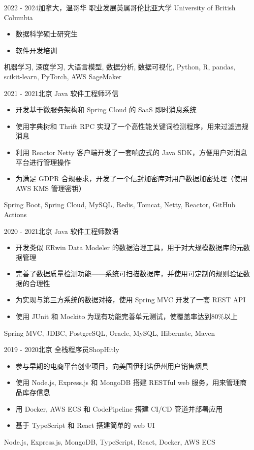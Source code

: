 \begin{experiences}

\experience
{2022 - 2024}{加拿大，温哥华}
{职业发展}{英属哥伦比亚大学 University of British Columbia}
{
    \begin{itemize}
    \item 数据科学硕士研究生
    \item 软件开发培训
    \end{itemize}
}
{机器学习, 深度学习, 大语言模型, 数据分析, 数据可视化, Python, R, pandas, scikit-learn, PyTorch, AWS SageMaker}

\experience
{2021 - 2021}{北京}
{Java 软件工程师}{环信}
{
    \begin{itemize}
    \item 开发基于微服务架构和 Spring Cloud 的 SaaS 即时消息系统
    \item 使用字典树和 Thrift RPC 实现了一个高性能关键词检测程序，用来过滤违规消息
    \item 利用 Reactor Netty 客户端开发了一套响应式的 Java SDK，方便用户对消息平台进行管理操作
    \item 为满足 GDPR 合规要求，开发了一个信封加密库对用户数据加密处理（使用 AWS KMS 管理密钥）
    \end{itemize}
}
{Spring Boot, Spring Cloud, MySQL, Redis, Tomcat, Netty, Reactor, GitHub Actions}

\experience
{2020 - 2021}{北京}
{Java 软件工程师}{数语}
{
    \begin{itemize}
    \item 开发类似 ERwin Data Modeler 的数据治理工具，用于对大规模数据库的元数据管理
    \item 完善了数据质量检测功能——系统可扫描数据库，并使用可定制的规则验证数据的合理性
    \item 为实现与第三方系统的数据对接，使用 Spring MVC 开发了一套 REST API
    \item 使用 JUnit 和 Mockito 为现有功能完善单元测试，使覆盖率达到80\%以上
    \end{itemize}
}
{Spring MVC, JDBC, PostgreSQL, Oracle, MySQL, Hibernate, Maven}

\experience
{2019 - 2020}{北京}
{全栈程序员}{ShopHitly}
{
    \begin{itemize}
    \item 参与早期的电商平台创业项目，向美国伊利诺伊州用户销售烟具
    \item 使用 Node.js, Express.js 和 MongoDB 搭建 RESTful web 服务，用来管理商品库存信息
    \item 用 Docker, AWS ECS 和 CodePipeline 搭建 CI/CD 管道并部署应用
    \item 基于 TypeScript 和 React 搭建简单的 web UI
    \end{itemize}
}
{Node.js, Express.js, MongoDB, TypeScript, React, Docker, AWS ECS}


\end{experiences}
